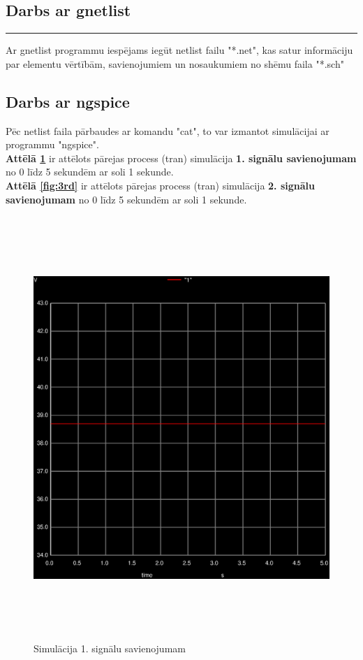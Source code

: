 \documentclass {report}
\begin{document}
\subsection{Darbs ar gnetlist}
\hrule \relax
\indent Ar gnetlist programmu iespējams iegūt netlist failu "*.net", kas satur informāciju par elementu vērtībām, savienojumiem un nosaukumiem no shēmu faila "*.sch"

\subsection{Darbs ar ngspice}
\indent Pēc netlist faila pārbaudes ar komandu "cat", to var izmantot simulācijai ar programmu "ngspice". \\
\indent \textbf{Attēlā \ref{fig:2nd}} ir attēlots pārejas process (tran) simulācija \textbf{1. signālu savienojumam} no 0 līdz 5 sekundēm ar soli 1 sekunde. \\
\indent \textbf{Attēlā \ref{fig:3rd}} ir attēlots pārejas process (tran) simulācija \textbf{2. signālu savienojumam} no 0 līdz 5 sekundēm ar soli 1 sekunde.

\begin{figure}[!h]
    \centering
        \includegraphics[width=16cm,height=16cm,keepaspectratio]{pictures/011.ps}
    \caption{Simulācija 1. signālu savienojumam}
    \label{fig:2nd}
\end{figure}
\end{document}
